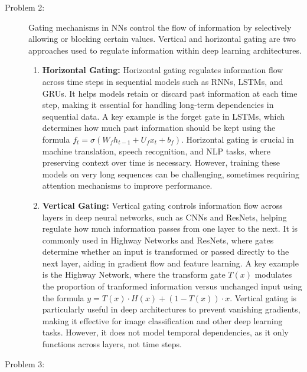 \documentclass[10pt]{article}
\begin{document}
\begin{description}
\pagebreak

\item[Problem 2:]  \hfill %

Gating mechanisms in NNs control the flow of information by selectively allowing or blocking certain values. 
Vertical and horizontal gating are two approaches used to regulate information within deep learning architectures.

\begin{enumerate}
    \item \textbf{Horizontal Gating:} Horizontal gating regulates information flow across time steps in sequential models such as RNNs,
    LSTMs, and GRUs. It helps models retain or discard past information at each time step, making it essential for handling long-term dependencies in sequential data.
    A key example is the forget gate in LSTMs, which determines how much past information should be kept using the formula $f_t = \sigma(W_f h_{t-1} + U_f x_t + b_f)$.
    Horizontal gating is crucial in machine translation, speech recognition, and NLP tasks, where preserving context over time is necessary. 
    However, training these models on very long sequences can be challenging, sometimes requiring attention mechanisms to improve performance.

    \item \textbf{Vertical Gating:} Vertical gating controls information flow across layers in deep neural networks, such as CNNs and ResNets, 
    helping regulate how much information passes from one layer to the next. 
    It is commonly used in Highway Networks and ResNets, where gates determine whether an input is transformed or passed directly to the next layer,
    aiding in gradient flow and feature learning. A key example is the Highway Network, where the transform gate $T(x)$ modulates the proportion of tranformed information
    versus unchanged input using the formula $y = T(x) \cdot H(x) + (1 - T(x)) \cdot x$. Vertical gating is particularly useful in deep architectures to prevent vanishing 
    gradients, making it effective for image classification and other deep learning tasks. However, it does not model temporal dependencies, as it only functions across 
    layers, not time steps.
    
\end{enumerate}

\pagebreak

\item[Problem 3:]  \hfill %


\end{description}
\end{document}
